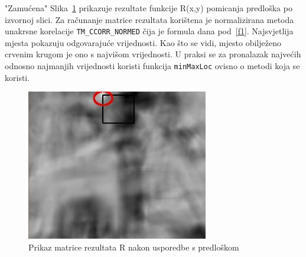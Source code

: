 \newpage
"Zamućena" Slika~\ref{fig:tm3.jpg} prikazuje rezultate funkcije R(x,y) pomicanja
predloška po izvornoj slici. Za računanje matrice rezultata korištena je normalizirana metoda
unakrsne korelacije \texttt{TM\_CCORR\_NORMED} čija je
formula dana pod~\ref{f1}.
Najsvjetlija mjesta pokazuju odgovarajuće vrijednosti. Kao što se vidi,
mjesto obilježeno crvenim krugom je ono s najvišom vrijednosti. U praksi
se za pronalazak najvećih odnosno najmanjih vrijednosti koristi funkcija
\texttt{minMaxLoc} ovisno o metodi koja se koristi.


\begin{figure}[h]
\centering
\includegraphics[scale=0.8]{figures/tm3.jpg}
\caption{Prikaz matrice rezultata R nakon usporedbe s predloškom}
\label{fig:tm3.jpg}
\end{figure}

